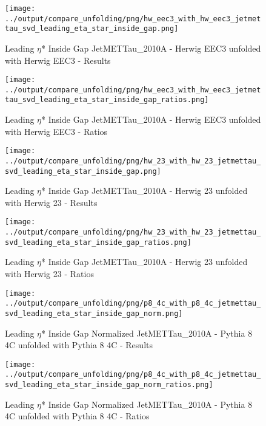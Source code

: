 \documentclass[11pt]{book}
\begin{document}
\begin{figure}[ht]
\centering
\texttt{[image: ../output/compare\_unfolding/png/hw\_eec3\_with\_hw\_eec3\_jetmettau\_svd\_leading\_eta\_star\_inside\_gap.png]}
\caption{Leading $\eta$* Inside Gap JetMETTau\_2010A - Herwig EEC3 unfolded with Herwig EEC3 - Results}
\label{hw_eec3_hw_eec3_jetmettau_svd_leading_eta_star_inside_gap_a}
\end{figure}

\begin{figure}[ht]
\centering
\texttt{[image: ../output/compare\_unfolding/png/hw\_eec3\_with\_hw\_eec3\_jetmettau\_svd\_leading\_eta\_star\_inside\_gap\_ratios.png]}
\caption{Leading $\eta$* Inside Gap JetMETTau\_2010A - Herwig EEC3 unfolded with Herwig EEC3 - Ratios}
\label{hw_eec3_hw_eec3_jetmettau_svd_leading_eta_star_inside_gap_b}
\end{figure}

\begin{figure}[ht]
\centering
\texttt{[image: ../output/compare\_unfolding/png/hw\_23\_with\_hw\_23\_jetmettau\_svd\_leading\_eta\_star\_inside\_gap.png]}
\caption{Leading $\eta$* Inside Gap JetMETTau\_2010A - Herwig 23 unfolded with Herwig 23 - Results}
\label{hw_23_hw_23_jetmettau_svd_leading_eta_star_inside_gap_a}
\end{figure}

\begin{figure}[ht]
\centering
\texttt{[image: ../output/compare\_unfolding/png/hw\_23\_with\_hw\_23\_jetmettau\_svd\_leading\_eta\_star\_inside\_gap\_ratios.png]}
\caption{Leading $\eta$* Inside Gap JetMETTau\_2010A - Herwig 23 unfolded with Herwig 23 - Ratios}
\label{hw_23_hw_23_jetmettau_svd_leading_eta_star_inside_gap_b}
\end{figure}


\begin{figure}[ht]
\centering
\texttt{[image: ../output/compare\_unfolding/png/p8\_4c\_with\_p8\_4c\_jetmettau\_svd\_leading\_eta\_star\_inside\_gap\_norm.png]}
\caption{Leading $\eta$* Inside Gap Normalized JetMETTau\_2010A - Pythia 8 4C unfolded with Pythia 8 4C - Results}
\label{p8_p8_jetmettau_svd_leading_eta_star_inside_gap_norm_a}
\end{figure}

\begin{figure}[ht]
\centering
\texttt{[image: ../output/compare\_unfolding/png/p8\_4c\_with\_p8\_4c\_jetmettau\_svd\_leading\_eta\_star\_inside\_gap\_norm\_ratios.png]}
\caption{Leading $\eta$* Inside Gap Normalized JetMETTau\_2010A - Pythia 8 4C unfolded with Pythia 8 4C - Ratios}
\label{p8_p8_jetmettau_svd_leading_eta_star_inside_gap_norm_b}
\end{figure}
\end{document}
